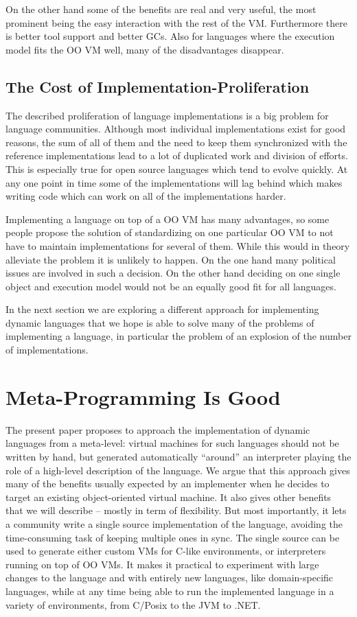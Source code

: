 \documentclass[utf8x]{llncs}
\begin{document}
On the other hand some of the benefits are real and very useful, the most
prominent being the easy interaction with the rest of the VM. Furthermore there
is better tool support and better GCs. Also for languages where the execution
model fits the OO VM well, many of the disadvantages disappear.


\subsection{The Cost of Implementation-Proliferation}

The described proliferation of language implementations is a big problem for
language communities. Although most individual implementations exist for good
reasons, the sum of all of them and the need to keep them synchronized with the
reference implementations lead to a lot of duplicated work and division of
efforts. This is especially true for open source languages which tend to evolve
quickly. At any one point in time some of the implementations will lag behind
which makes writing code which can work on all of the implementations harder.

Implementing a language on top of a OO VM has many advantages, so some
people propose the solution of standardizing on one particular OO VM to not have
to maintain implementations for several of them. While this would in theory
alleviate the problem it is unlikely to happen. On the one hand many political
issues are involved in such a decision. On the other hand deciding on one single
object and execution model would not be an equally good fit for all languages.

In the next section we are exploring a different approach for implementing
dynamic languages that we hope is able to solve many of the problems of
implementing a language, in particular the problem of an explosion of the number
of implementations.

\section{Meta-Programming Is Good}
\label{sect:metaprogramming}

The present paper proposes to approach the implementation of dynamic
languages from a meta-level: virtual machines for such languages should
not be written by hand, but generated automatically ``around'' an
interpreter playing the role of a high-level description of the language.  We
argue that this approach gives many of the benefits usually expected by
an implementer when he decides to target an existing object-oriented
virtual machine.  It also gives other benefits that we will describe --
mostly in term of flexibility.  But most importantly, it lets a
community write a single source implementation of the language, avoiding
the time-consuming task of keeping multiple ones in sync.  The single
source can be used to generate either custom VMs for C-like
environments, or interpreters running on top of OO VMs.  It makes it
practical to experiment with large changes to the language and with
entirely new languages, like domain-specific languages, while at any
time being able to run the implemented language in a variety of
environments, from C/Posix to the JVM to .NET.
\end{document}
